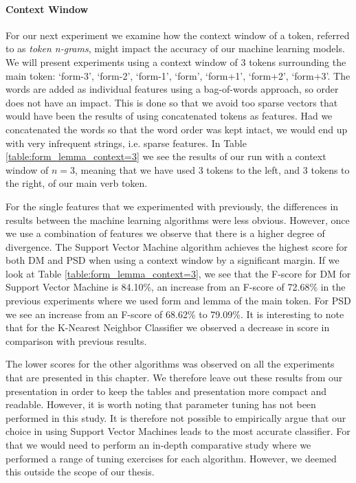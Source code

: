 \paragraph{Context Window} For our next experiment we examine how the context window of a token, referred to as \textit{token n-grams}, might impact the accuracy of our machine learning models. We will present experiments using a context window of 3 tokens surrounding the main token: `form-3', `form-2', `form-1', `form', `form+1', `form+2', `form+3'. The words are added as individual features using a bag-of-words approach, so order does not have an impact. This is done so that we avoid too sparse vectors that would have been the results of using concatenated tokens as features. Had we concatenated the words so that the word order was kept intact, we would end up with very infrequent strings, i.e. sparse features. In Table \ref{table:form_lemma_context=3} we see the results of our run with a context window of $n=3$, meaning that we have used 3 tokens to the left, and 3 tokens to the right, of our main verb token.

For the single features that we experimented with previously, the differences in results between the machine learning algorithms were less obvious. However, once we use a combination of features we observe that there is a higher degree of divergence. The Support Vector Machine algorithm achieves the highest score for both DM and PSD when using a context window by a significant margin. If we look at Table \ref{table:form_lemma_context=3}, we see that the F-score for DM for Support Vector Machine is 84.10\%, an increase from an F-score of 72.68\% in the previous experiments where we used form and lemma of the main token. For PSD we see an increase from an F-score of 68.62\% to 79.09\%. It is interesting to note that for the K-Nearest Neighbor Classifier we observed a decrease in score in comparison with previous results. 

The lower scores for the other algorithms was observed on all the experiments that are presented in this chapter. We therefore leave out these results from our presentation in order to keep the tables and presentation more compact and readable. However, it is worth noting that parameter tuning has not been performed in this study. It is therefore not possible to empirically argue that our choice in using Support Vector Machines leads to the most accurate classifier. For that we would need to perform an in-depth comparative study where we performed a range of tuning exercises for each algorithm. However, we deemed this outside the scope of our thesis.

